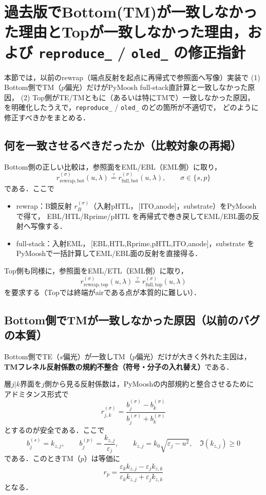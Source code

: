 \section{過去版でBottom(TM)が一致しなかった理由とTopが一致しなかった理由，および \texttt{reproduce\_\*\*} / \texttt{oled\_\*\*} の修正指針}

本節では，以前のrewrap（端点反射を起点に再帰式で参照面へ写像）実装で
(1) Bottom側でTM（$p$偏光）だけがPyMoosh full-stack直計算と一致しなかった原因，
(2) Top側がTE/TMともに（あるいは特にTMで）一致しなかった原因，
を明確化したうえで，\texttt{reproduce\_\*\*} / \texttt{oled\_\*\*} のどの箇所が不適切で，
どのように修正すべきかをまとめる．

\subsection{何を一致させるべきだったか（比較対象の再掲）}

Bottom側の正しい比較は，参照面をEML/EBL（EML側）に取り，
\[
r_{\mathrm{rewrap,bot}}^{(\sigma)}(u,\lambda)
\stackrel{?}{=}
r_{\mathrm{full,bot}}^{(\sigma)}(u,\lambda),
\qquad \sigma\in\{s,p\}
\]
である．ここで
\begin{itemize}
\item rewrap：B鏡反射 $r_B^{(\sigma)}$（入射pHTL，\,[ITO,anode]，substrate）をPyMooshで得て，
      EBL/HTL/Rprime/pHTL を再帰式で巻き戻してEML/EBL面の反射へ写像する．
\item full-stack：入射EML，\,[EBL,HTL,Rprime,pHTL,ITO,anode]，substrate をPyMooshで一括計算してEML/EBL面の反射を直接得る．
\end{itemize}
Top側も同様に，参照面をEML/ETL（EML側）に取り，
\[
r_{\mathrm{rewrap,top}}^{(\sigma)}(u,\lambda)
\stackrel{?}{=}
r_{\mathrm{full,top}}^{(\sigma)}(u,\lambda)
\]
を要求する（Topでは終端がairである点が本質的に難しい）．

\subsection{Bottom側でTMが一致しなかった原因（以前のバグの本質）}

Bottom側でTE（$s$偏光）が一致しTM（$p$偏光）だけが大きく外れた主因は，
\textbf{TMフレネル反射係数の規約不整合（符号・分子の入れ替え）}である．

層$j|k$界面を$j$側から見る反射係数は，PyMooshの内部規約と整合させるために
アドミタンス形式で
\[
r_{j,k}^{(\sigma)}=\frac{b_j^{(\sigma)}-b_k^{(\sigma)}}{b_j^{(\sigma)}+b_k^{(\sigma)}}
\]
とするのが安全である．ここで
\[
b_j^{(s)}=k_{z,j},
\qquad
b_j^{(p)}=\frac{k_{z,j}}{\varepsilon_j},
\qquad
k_{z,j}=k_0\sqrt{\varepsilon_j-u^2},\quad \Im(k_{z,j})\ge 0
\]
である．このときTM（$p$）は等価に
\[
\boxed{
r_p=\frac{\varepsilon_k k_{z,j}-\varepsilon_j k_{z,k}}
{\varepsilon_k k_{z,j}+\varepsilon_j k_{z,k}}
}
\]
となる．

